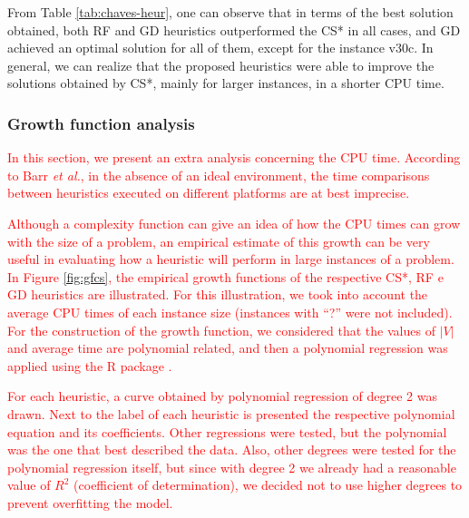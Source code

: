 \documentclass{ro}
\begin{document}
From Table \ref{tab:chaves-heur}, one can observe that in terms of the best solution obtained,  both RF and GD heuristics outperformed the CS* in all cases, and GD achieved an optimal solution for all of them, except for the instance v30c. In general, we can realize that the proposed heuristics were able to improve the solutions obtained by CS*, mainly for  larger instances, in a shorter CPU time.


\subsubsection{Growth function analysis}

\textcolor{red}{In this section, we present an extra analysis concerning the CPU time. According to Barr \textit{et al.}\cite{barr2001guidelines}, in the absence of an ideal environment, the time comparisons between heuristics executed on different platforms are at best imprecise.}

\textcolor{red}{
Although a complexity function can give an idea of how the CPU times can grow with the size of a problem, an empirical estimate of this growth can be very useful in evaluating how a heuristic will perform in large instances of a problem. In Figure \ref{fig:gfcs}, the empirical growth functions of the respective CS*, RF e GD heuristics are illustrated. For this illustration, we took into account the average CPU times of each instance size (instances with ``?'' were not included). For the construction of the growth function, we considered that the values of $|V|$ and average time are polynomial related, and then a polynomial regression was applied using the R package \cite{r-package}.}

\textcolor{red}{
For each heuristic, a curve obtained by polynomial regression of degree 2 was drawn. Next to the label of each heuristic is presented the respective polynomial equation and its coefficients. Other regressions were tested, but the polynomial was the one that best described the data. Also, other degrees were tested for the polynomial regression itself, but since with degree 2 we already had a reasonable value of $R^2$ (coefficient of determination), we decided not to use higher degrees to prevent overfitting the model.}
\end{document}
